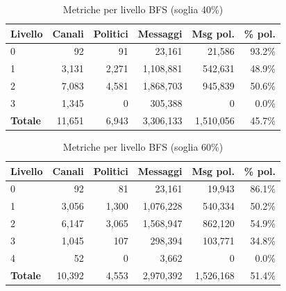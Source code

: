 \begin{table}[htbp]
\centering
\caption{Metriche per livello BFS (soglia 40\%)}
\label{tab:levels_40}
\begin{tabular}{lrrrrr}
\toprule
\textbf{Livello} & \textbf{Canali} & \textbf{Politici} & \textbf{Messaggi} & \textbf{Msg pol.} & \textbf{\% pol.} \\
\midrule
0 & 92 & 91 & 23,161 & 21,586 & 93.2\% \\
1 & 3,131 & 2,271 & 1,108,881 & 542,631 & 48.9\% \\
2 & 7,083 & 4,581 & 1,868,703 & 945,839 & 50.6\% \\
3 & 1,345 & 0 & 305,388 & 0 & 0.0\% \\
\midrule
\textbf{Totale} & 11,651 & 6,943 & 3,306,133 & 1,510,056 & 45.7\% \\
\bottomrule
\end{tabular}
\end{table}

\begin{table}[htbp]
\centering
\caption{Metriche per livello BFS (soglia 60\%)}
\label{tab:levels_60}
\begin{tabular}{lrrrrr}
\toprule
\textbf{Livello} & \textbf{Canali} & \textbf{Politici} & \textbf{Messaggi} & \textbf{Msg pol.} & \textbf{\% pol.} \\
\midrule
0 & 92 & 81 & 23,161 & 19,943 & 86.1\% \\
1 & 3,056 & 1,300 & 1,076,228 & 540,334 & 50.2\% \\
2 & 6,147 & 3,065 & 1,568,947 & 862,120 & 54.9\% \\
3 & 1,045 & 107 & 298,394 & 103,771 & 34.8\% \\
4 & 52 & 0 & 3,662 & 0 & 0.0\% \\
\midrule
\textbf{Totale} & 10,392 & 4,553 & 2,970,392 & 1,526,168 & 51.4\% \\
\bottomrule
\end{tabular}
\end{table}

